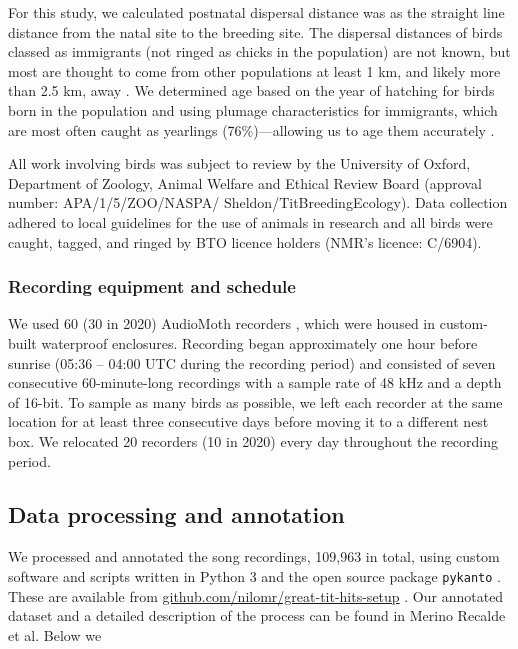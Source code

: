 \documentclass[9pt, onecolumn, twoside, lineno]{gsajnl}
\begin{document}
For this study, we calculated postnatal dispersal distance was as the straight line distance from the natal site to the breeding site. The dispersal distances of birds classed as immigrants (not ringed as chicks in the population) are not known, but most are thought to come from other populations at least 1 km, and likely more than 2.5 km, away \autocite{verhulst1997, quinn2011}. We determined age based on the year of hatching for birds born in the population and using plumage characteristics for immigrants, which are most often caught as yearlings (76\%)---allowing us to age them accurately \autocite{woodman2023}.

All work involving birds was subject to review by the University of Oxford, Department of Zoology, Animal Welfare and Ethical Review Board (approval number: APA/1/5/ZOO/NASPA/ Sheldon/TitBreedingEcology). Data collection adhered to local guidelines for the use of animals in research and all birds were caught, tagged, and ringed by BTO licence holders (NMR's licence: C/6904).

\subsubsection{Recording equipment and schedule}
We used 60 (30 in 2020) AudioMoth recorders \autocite{hill2019}, which were housed in custom-built waterproof enclosures. Recording began approximately one hour before sunrise (05:36 -- 04:00 UTC during the recording period) and consisted of seven consecutive 60-minute-long recordings with a sample rate of 48 kHz and a depth of 16-bit. To sample as many birds as possible, we left each recorder at the same location for at least three consecutive days before moving it to a different nest box. We relocated 20 recorders (10 in 2020) every day throughout the recording period.

\subsection{Data processing and annotation}

We processed and annotated the song recordings, 109,963 in total, using custom software and scripts written in Python 3 \autocite{vanrossum1995} and the open source package \texttt{pykanto} \autocite{merinorecalde2023}. These are available from \href{https://github.com/nilomr/great-tit-hits-setup}{github.com/nilomr/great-tit-hits-setup} \autocite{nilo_gretidataset_setup_2023}. Our annotated dataset and a detailed description of the process can be found in Merino Recalde et al\autocite{merinorecalde2023a}. Below we
\end{document}
